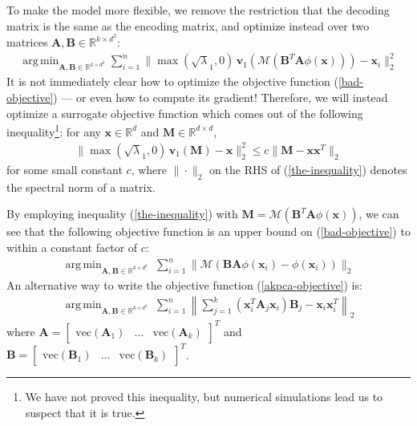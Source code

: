 \documentclass[]{article}
\newcommand{\reals}{\mathbb{R}}
\DeclareMathOperator*{\argmin}{arg\,min}
\begin{document}
To make the model more flexible, we remove the restriction that the decoding matrix is the same as the encoding matrix, and optimize instead over two matrices $\mathbf{A}, \mathbf{B} \in \reals^{k \times d^2}$:
\begin{align}
\label{bad-objective}
 \argmin_{\mathbf{A}, \mathbf{B} \in \reals^{k \times d^2}} \sum_{i=1}^n \| \max(\sqrt\lambda_1, 0) \, \mathbf{v}_1(\mathcal{M}(\mathbf{B}^T \mathbf{A} \phi(\mathbf{x}))) - \mathbf{x}_i \|^2_2
\end{align}
It is not immediately clear how to optimize the objective function (\ref{bad-objective}) --- or even how to compute its gradient!
Therefore, we will instead optimize a surrogate objective function which comes out of the following inequality\footnote{We have not proved this inequality, but numerical simulations lead us to suspect that it is true.}: for any $\mathbf{x} \in \reals^d$ and $\mathbf{M} \in \reals^{d \times d}$,
\begin{align}
\label{the-inequality}
\| \max(\sqrt\lambda_1, 0) \, \mathbf{v}_1(\mathbf{M}) - \mathbf{x} \|^2_2 \le c \| \mathbf{M} - \mathbf{x} \mathbf{x}^T \|_2
\end{align}
for some small constant $c$, where $\| \cdot \|_2$ on the RHS of (\ref{the-inequality}) denotes the spectral norm of a matrix.

By employing inequality (\ref{the-inequality}) with $\mathbf{M} = \mathcal{M}(\mathbf{B}^T \mathbf{A} \phi(\mathbf{x}))$, we can see that the following objective function is an upper bound on (\ref{bad-objective}) to within a constant factor of $c$:
\begin{align}
\label{akpca-objective}
 \argmin_{\mathbf{A}, \mathbf{B} \in \reals^{k \times d^2}} \; \sum_{i=1}^n \| \mathcal{M}(\mathbf{B} \mathbf{A} \phi(\mathbf{x}_i) - \phi(\mathbf{x}_i)) \|_2
\end{align}
An alternative way to write the objective function (\ref{akpca-objective}) is:
\begin{align}
\label{akpca-objective-unraveled}
 \argmin_{\mathbf{A}, \mathbf{B} \in \reals^{k \times d^2}}  \; \sum_{i=1}^n \left \| \sum_{j=1}^k (\mathbf{x}_i^T \mathbf{A}_j \mathbf{x}_i) \mathbf{B}_j  - \mathbf{x}_i \mathbf{x}_i^T \right \|_2
\end{align}
where $\mathbf{A} = \begin{bmatrix} \text{vec}(\mathbf{A}_1) & \hdots & \text{vec}(\mathbf{A}_k) \end{bmatrix}^T$ and $\mathbf{B} = \begin{bmatrix} \text{vec}(\mathbf{B}_1) & \hdots & \text{vec}(\mathbf{B}_k)
\end{bmatrix}^T$.
\end{document}
